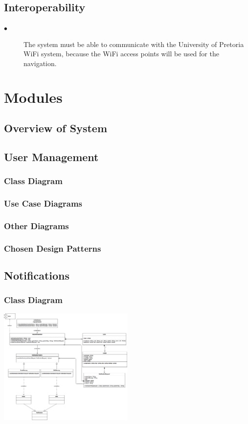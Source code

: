 \documentclass{article}
\begin{document}
    \subsection{Interoperability}
    
        \begin{description}
        
        \item[$\bullet$]The system must be able to communicate with the University of Pretoria WiFi system, because the WiFi  access points will be used for the navigation.
        
        \end{description}

\section{Modules}
	
	\subsection{Overview of System}
	
    \subsection{User Management}
        \subsubsection{Class Diagram}
        \subsubsection{Use Case Diagrams}
        \subsubsection{Other Diagrams}
        \subsubsection{Chosen Design Patterns}
    \subsection{Notifications}
        \subsubsection{Class Diagram}
    			\includegraphics[width=0.5\textwidth]{Notifications_Class_Diagram}
\end{document}
